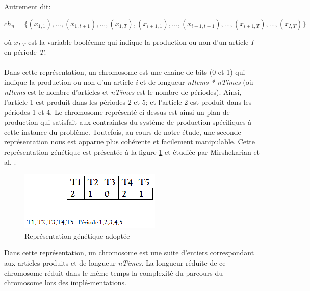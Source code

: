 \documentclass[12pt,a4paper]{article}
\begin{document}
	Autrement dit:
	\begin{center}
		$ch_{n} = \{(x_{1,1}),..., (x_{1,t+1}),..., ( x_{1,T}), (x_{i+1,1}),...,(x_{i+1, t+1}),..., (x_{i+1,T}),..., (x_{I,T})\}$ \\
	\end{center}
	\hspace*{.5cm} où $x_{I,T}$ est la variable booléenne qui indique la production ou non d'un article \emph{I} en période \emph{T}.  \\
	\\
	\hspace*{.5cm} Dans cette représentation, un chromosome est une chaîne de bits (0 et 1) qui indique la production ou non d'un article \emph{i} et de longueur \emph{nItems * nTimes} (où \emph{nItems} est le nombre d'articles et \emph{nTimes} est le nombre de périodes). Ainsi, l'article 1 est produit dans les périodes 2 et 5; et l'article 2 est produit dans les périodes 1 et 4. Le chromosome représenté ci-dessus est ainsi un plan de production qui satisfait aux contraintes du système de production spécifiques à cette instance du problème. Toutefois, au cours de notre étude, une seconde représentation nous est apparue plus cohérente et facilement manipulable. Cette représentation génétique est présentée à la figure \ref{fig:adopt_gene_repr} et étudiée par Mirshekarian et al. \cite{suer}.
	
	\begin{figure}[!h]
		\begin{center}
			\includegraphics[scale=.5]{img/adopt_gene_repr.png}
			\caption{Représentation génétique adoptée}
			\label{fig:adopt_gene_repr}
		\end{center}
	\end{figure}
	
	Dans cette représentation, un chromosome est une suite d'entiers correspondant aux articles produits et de longueur \emph{nTimes}. La longueur réduite de ce chromosome réduit dans le même temps la complexité du parcours du chromosome lors des implé-mentations.
\end{document}
